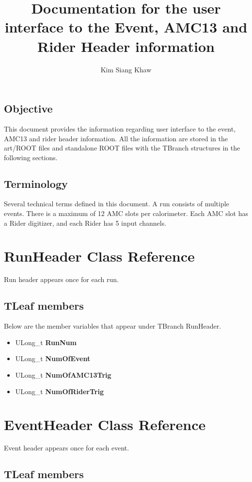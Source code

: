 \documentclass[12pt,letterpaper]{article}
\author{Kim Siang Khaw}
\title{Documentation for the user interface to the Event, AMC13 and Rider Header information}
\begin{document}
\maketitle

\subsection*{Objective}
This document provides the information regarding user interface to the event, AMC13 and rider header information. All the information are stored in the art/ROOT files and standalone ROOT files with the TBranch structures in the following sections.

\subsection*{Terminology}
Several technical terms defined in this document. A run consists of multiple events. There is a maximum of 12 AMC slots per calorimeter. Each AMC slot has a Rider digitizer, and each Rider has 5 input channels.

\newpage
\section{RunHeader Class Reference}
Run header appears once for each run.

\subsection*{TLeaf members}

Below are the member variables that appear under TBranch RunHeader.

\begin{itemize}
\item ULong\_t \textbf{RunNum}
\item ULong\_t \textbf{NumOfEvent}
\item ULong\_t \textbf{NumOfAMC13Trig}
\item ULong\_t \textbf{NumOfRiderTrig}
\end{itemize}

\newpage
\section{EventHeader Class Reference}
Event header appears once for each event.

\subsection*{TLeaf members}
\end{document}

